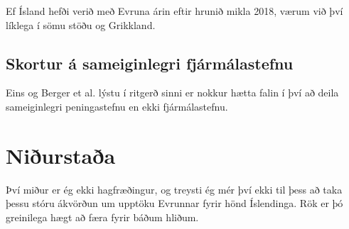 \documentclass[a4paper]{article}
\begin{document}
Ef Ísland hefði verið með Evruna árin eftir hrunið mikla 2018, værum við því líklega í sömu stöðu og Grikkland.

\subsection{Skortur á sameiginlegri fjármálastefnu}

Eins og Berger et al. lýstu í ritgerð sinni  er nokkur hætta falin í því að deila sameiginlegri peningastefnu en ekki fjármálastefnu.\cite{fiscal_union}

\section{Niðurstaða}

Því miður er ég ekki hagfræðingur, og treysti ég mér því ekki til þess að taka þessu stóru ákvörðun um upptöku Evrunnar fyrir hönd Íslendinga. Rök er þó greinilega hægt að færa fyrir báðum hliðum.

\newpage


\end{document}
